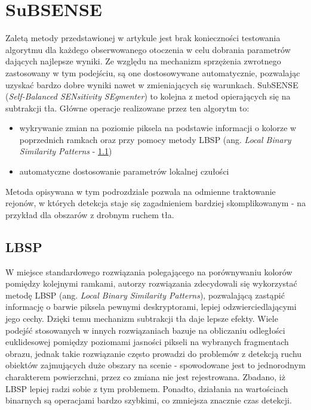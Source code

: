 \section{SuBSENSE}
Zaletą metody przedstawionej w artykule \citep{stflexible} jest brak konieczności testowania algorytmu dla każdego obserwowanego otoczenia w celu dobrania parametrów dających najlepsze wyniki. Ze względu na mechanizm sprzężenia zwrotnego zastosowany w tym podejściu, są one dostosowywane automatycznie, pozwalając uzyskać bardzo dobre wyniki nawet w zmieniających się warunkach. SubSENSE (\textit{Self-Balanced SENsitivity SEgmenter}) to kolejna z metod opierających się na subtrakcji tła. Główne operacje realizowane przez ten algorytm to:
\begin{itemize}
\item wykrywanie zmian na poziomie piksela na podstawie informacji o kolorze w poprzednich ramkach oraz przy pomocy metody LBSP (ang. \textit{Local Binary Similarity Patterns} - \ref{sec:LBSP})
\item automatyczne dostosowanie parametrów lokalnej czułości
\end{itemize}
Metoda opisywana w tym podrozdziale pozwala na odmienne traktowanie rejonów, w których detekcja staje się zagadnieniem bardziej skomplikowanym - na przykład dla obszarów z drobnym ruchem tła. 
\subsection{LBSP}
\label{sec:LBSP}
W miejsce standardowego rozwiązania polegającego na porównywaniu kolorów pomiędzy kolejnymi ramkami, autorzy rozwiązania zdecydowali się wykorzystać metodę LBSP \citep{bilodeau2013change} (ang. \textit{Local Binary Similarity Patterns}), pozwalającą zastąpić informację o barwie piksela pewnymi deskryptorami, lepiej odzwierciedlającymi jego cechy. Dzięki temu mechanizm subtrakcji tła daje lepsze efekty. Wiele podejść stosowanych w innych rozwiązaniach bazuje na obliczaniu odległości euklidesowej pomiędzy poziomami jasności pikseli na wybranych fragmentach obrazu, jednak takie rozwiązanie często prowadzi do problemów z detekcją ruchu obiektów zajmujących duże obszary na scenie - spowodowane jest to jednorodnym charakterem powierzchni, przez co zmiana nie jest rejestrowana. Zbadano, iż LBSP lepiej radzi sobie z tym problemem. Ponadto, działania na wartościach binarnych są operacjami bardzo szybkimi, co zmniejsza znacznie czas detekcji.
